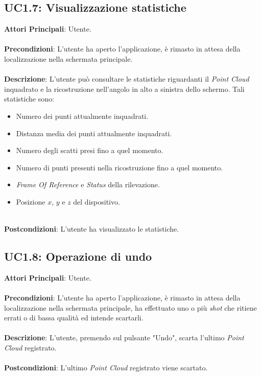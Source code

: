 \subsection{UC1.7: Visualizzazione statistiche}
\textbf{Attori Principali}: Utente.
\\\\ \textbf{Precondizioni}: L'utente ha aperto l'applicazione, è rimasto in attesa della localizzazione nella schermata principale.
\\\\ \textbf{Descrizione}: L'utente può consultare le statistiche riguardanti il \emph{Point Cloud} inquadrato e la ricostruzione nell'angolo in alto a sinistra dello schermo. Tali statistiche sono:
\begin{itemize}
	\item Numero dei punti attualmente inquadrati.
	\item Distanza media dei punti attualmente inquadrati.
	\item Numero degli scatti presi fino a quel momento.
	\item Numero di punti presenti nella ricostruzione fino a quel momento.
	\item \emph{Frame Of Reference} e \emph{Status} della rilevazione.
	\item Posizione $x$, $y$ e $z$ del dispositivo.
\end{itemize} 
\ \\ \textbf{Postcondizioni}: L'utente ha visualizzato le statistiche.

\subsection{UC1.8: Operazione di undo}
\textbf{Attori Principali}: Utente.
\\\\ \textbf{Precondizioni}: L'utente ha aperto l'applicazione, è rimasto in attesa della localizzazione nella schermata principale, ha effettuato uno o più \emph{shot} che ritiene errati o di bassa qualità ed intende scartarli.
\\\\ \textbf{Descrizione}: L'utente, premendo sul pulsante "Undo", scarta l'ultimo \emph{Point Cloud} registrato.
\\\\ \textbf{Postcondizioni}: L'ultimo \emph{Point Cloud} registrato viene scartato.




